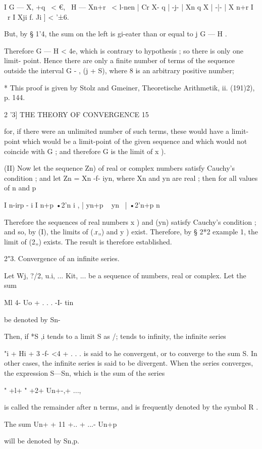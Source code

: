 I G — X, +q \ < €, \ H — Xn+r \ < l-nen | Cr X- q | -j- | Xn q X | -|-
| X n+r I ~r I Xji f. Ji ] < '±6.

But, by § 1'4, the sum on the left is gi-eater than or equal to j G —
H .

Therefore G — H < 4e, which is contrary to hypothesis ; so there is
only one limit- point. Hence there are only a finite number of terms
of the sequence outside the interval G - , (j + S), where 8 is an
arbitrary positive number;

* This proof is given by Stolz and Gmeiner, Theoretische Arithmetik,
ii. (191)2), p. 144.



2 '3] THE THEORY OF CONVERGENCE 15

for, if there were an unlimited number of such terms, these would have
a limit-point which would be a limit-point of the given sequence and
which would not coincide with G ; and therefore G is the limit of x ).

(II) Now let the sequence Zn) of real or complex numbers satisfy
Cauchy's condition ; and let Zn = Xn -f- iyn, where Xn and yn are real
; then for all values of n and p

I n-irp - i I n+p •2'n i , | yn+p ~ yn \ | •2'n+p n\-

Therefore the sequences of real numbers x ) and (yn) satisfy Cauchy's
condition ; and so, by (I), the limits of (.r„) and y ) exist.
Therefore, by § 2*2 example 1, the limit of (2„) exists. The result is
therefore established.

2"3. Convergence of an infinite series.

Let Wj, ?/2, u.i, ... Kit, ... be a sequence of numbers, real or
complex. Let the sum

Ml 4- Uo + . . . -I- tin

be denoted by Sn-

Then, if *S ,i tends to a limit S as /; tends to infinity, the
infinite series

"i + Hi + 3 -f- <4 + . . . is said to he convergent, or to converge to
the sum S. In other cases, the infinite series is said to be
divergent. When the series converges, the expression S—Sn, which is
the sum of the series

" +l+ " +2+ Un+-,+ ...,

is called the remainder after n terms, and is frequently denoted by
the symbol R .

The sum Un+ + 11 +.. + ...-\- Un+p

will be denoted by Sn,p.

